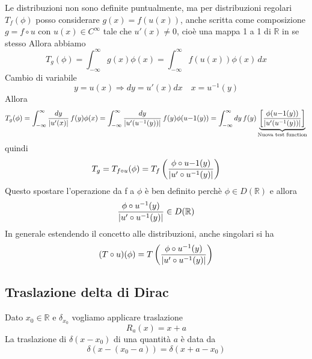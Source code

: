 \documentclass[a4paper,11pt]{report}
\theoremstyle{remark}
\theoremstyle{definition}
\newcommand{\R}{\mathbb{R}}
\DeclarePairedDelimiter{\abs}{\lvert}{\rvert}
\begin{document}
Le distribuzioni non sono definite puntualmente, ma per distribuzioni regolari $T_f(\phi)$ posso considerare $g(x)= f(u(x))$, anche scritta come composizione $g= f \circ u$ con $u(x)\in C^\infty$ tale che $u'(x)\ne 0$, cioè una mappa 1 a 1 di $\R$ in se stesso \newline
Allora abbiamo
\begin{equation*}
	T_g(\phi) = \int_{-\infty}^\infty g(x)\phi(x) = \int_{-\infty}^\infty f(u(x))\phi(x) \, dx  
\end{equation*}
Cambio di variabile
\begin{equation*}
	y = u(x) \Rightarrow dy=u'(x)dx \quad x = u^{-1}(y)
\end{equation*}
Allora
\begin{equation*}
	T_g(\phi) =\int_{-\infty}^\infty \frac{dy}{\abs{u'(x)}} \, f(y)\phi(x) = \int_{-\infty}^\infty \frac{dy}{\abs{u'(u^{-1}(y))}} \, f(y)\phi(u{-1}(y)) = \int_{-\infty}^\infty dy \, f(y) \underbrace{\left[\frac{\phi(u{-1}(y))}{\abs{u'(u^{-1}(y))}}\right]}_{\text{Nuova test function}} 
\end{equation*}
quindi
\begin{equation*}
	T_g = T_{f\circ u} (\phi) = T_f\left(\frac{\phi \circ u{-1}(y)}{\abs{u' \circ u^{-1}(y)}}\right) 
\end{equation*}
Questo spostare l'operazione da f a $\phi$ è ben definito perchè $\phi\in D(\R)$ e allora 
\begin{equation*}
	\frac{\phi \circ u^{-1}(y)}{\abs{u' \circ u^{-1}(y)}} \in D(\R)
\end{equation*}
In generale estendendo il concetto alle distribuzioni, anche singolari si ha
\begin{equation*}
	(T \circ u)(\phi) = T\left(\frac{\phi \circ u^{-1}(y)}{\abs{u' \circ u^{-1}(y)}}\right)
\end{equation*}

\subsection*{Traslazione delta di Dirac}

Dato $x_0 \in\R$ e $\delta_{x_0}$ vogliamo applicare traslazione 
\begin{equation*}
	R_a(x) = x+a
\end{equation*}
La traslazione di $\delta(x-x_0)$ di una quantità $a$ è data da 
\begin{equation*}
	\delta(x-(x_0-a)) = \delta(x+a-x_0)
\end{equation*}
\end{document}
